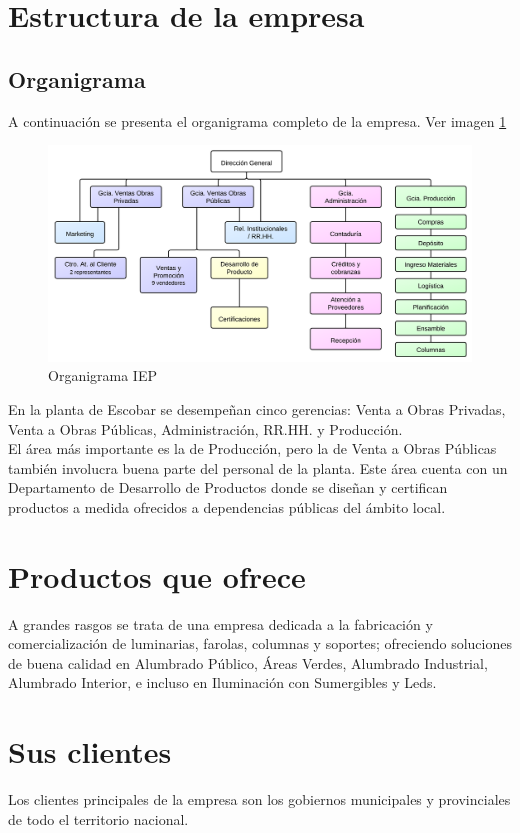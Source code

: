 \section{Estructura de la empresa}

\subsection{Organigrama}
A continuación se presenta el organigrama completo de la empresa. Ver imagen \ref{organigramaIEP}

\begin{figure}[h!]
  \centering
  \includegraphics[scale=0.85]{./Images/organigrama-pasado.png}
  \caption{Organigrama IEP}\label{organigramaIEP}
\end{figure}

En la planta de Escobar se desempe\~nan cinco gerencias: Venta a Obras Privadas, Venta a Obras P\'ublicas, Administraci\'on, RR.HH. y Producci\'on. \\
El \'area m\'as importante es la de Producci\'on, pero la de Venta a Obras P\'ublicas tambi\'en involucra buena parte del personal de la planta. Este \'area cuenta con un Departamento de Desarrollo de Productos donde se dise\~nan y certifican productos a medida ofrecidos a dependencias p\'ublicas del \'ambito local.

\section{Productos que ofrece}
A grandes rasgos se trata de una empresa dedicada a la fabricaci\'on y comercializaci\'on de luminarias, farolas, columnas y soportes; ofreciendo soluciones de buena calidad en Alumbrado P\'ublico, \'Areas Verdes, Alumbrado Industrial, Alumbrado Interior, e incluso en Iluminaci\'on con Sumergibles y Leds.

\section{Sus clientes}
Los clientes principales de la empresa son los gobiernos municipales y provinciales de todo el territorio nacional.

